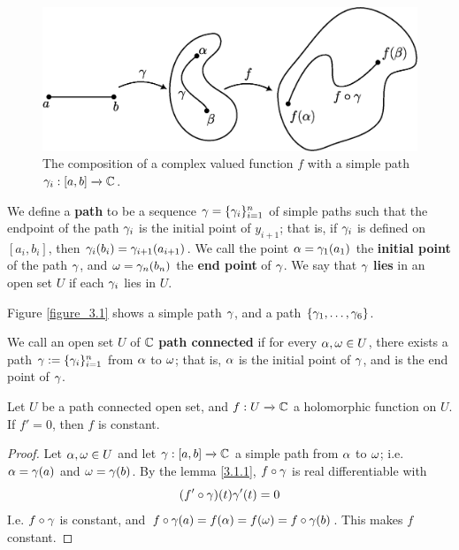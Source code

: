 \begin{figure}[h]
    \centering
    \includegraphics[scale=0.5]{Figures/Chapter3/path_composition.eps}
    \caption{The composition of a complex valued function $f$ with a simple path
     $\gamma_i:[a,b] \xrightarrow{} \mathbb{C}$.}
    \label{figure_3.2}
\end{figure}

\begin{definition}
    We define a \textbf{path} to be a sequence $\gamma=\{\gamma_i\}_{i=1}^n$ of simple
    paths such that the endpoint of the path $\gamma_i$ is the initial point of
    $y_{i+1}$; that is, if $\gamma_i$ is defined on  $[a_i,b_i]$, then
    $\gamma_i(b_i)=\gamma_{i+1}(a_{i+1})$. We call the point $\alpha=\gamma_1(a_1)$ the
    \textbf{initial point} of the path $\gamma$, and  $\omega=\gamma_n(b_n)$ the \textbf{end
    point} of $\gamma$. We say that  $\gamma$  \textbf{lies} in an open set $U$ if each
    $\gamma_i$ lies in $U$.
\end{definition}

Figure \ref{figure_3.1} shows a simple path $\gamma$, and a path $\{\gamma_1, \dots,
\gamma_6\}$.

\begin{definition}
    We call an open set $U$ of $\mathbb{C}$ \textbf{path connected} if for every $\alpha, \omega
    \in U$, there exists a path $\gamma:=\{\gamma_i\}_{i=1}^n$ from $\alpha$ to  $\omega$; that
    is,  $\alpha$ is the initial point of $\gamma$, and is the end point of $\gamma$.
\end{definition}

\begin{theorem}\label{3.1.2}
    Let $U$ be a path connected open set, and  $f:U \xrightarrow{} \mathbb{C}$ a
    holomorphic function on $U$. If  $f'=0$, then $f$ is constant.
\end{theorem}
\begin{proof}
    Let $\alpha,\omega \in U$ and let $\gamma:[a,b] \xrightarrow{} \mathbb{C}$ a simple path from
    $\alpha$ to  $\omega$; i.e. $\alpha=\gamma(a)$ and $\omega=\gamma(b)$. By the lemma \ref{3.1.1}, $f
    \circ \gamma$ is real differentiable with
    \begin{equation*}
        (f' \circ \gamma)(t)\gamma'(t)=0
    \end{equation*}
    I.e. $f \circ \gamma$ is constant, and  $f \circ \gamma(a)=f(\alpha)=f(\omega)=f \circ
    \gamma(b)$. This makes $f$ constant.
\end{proof}

